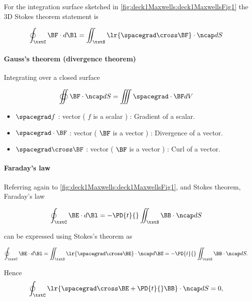 For the integration surface sketched in \cref{fig:deck1Maxwells:deck1MaxwellsFig1} the 3D Stokes theorem statement is

\begin{dmath}\label{eqn:uwavesLecture1:140}
\oint_\txtC \BF \cdot d\Bl = \iint_\txtS \lr{ \spacegrad \cross \BF } \cdot \ncap dS
\end{dmath}

\paragraph{Gauss's theorem (divergence theorem)}

Integrating over a closed surface

\begin{dmath}\label{eqn:uwavesLecture1:160}
\oiint \BF \cdot \ncap dS = \iiint \spacegrad \cdot \BF dV
\end{dmath}

\begin{itemize}
\item \( \spacegrad f \) :  vector ( \( f \) is a scalar ) : Gradient of a scalar.
\item \( \spacegrad \cdot \BF \) :  vector ( \( \BF \) is a vector ) : Divergence of a vector.
\item \( \spacegrad \cross \BF \) :  vector ( \( \BF \) is a vector ) : Curl of a vector.
\end{itemize}

\paragraph{Faraday's law}

Referring again to \cref{fig:deck1Maxwells:deck1MaxwellsFig1}, and Stokes theorem, Faraday's law

\begin{dmath}\label{eqn:uwavesLecture1:180}
\oint_\txtC \BE \cdot d\Bl = - \PD{t}{} \iint_\txtS \BB \cdot \ncap dS
\end{dmath}

can be expressed using Stokes's theorem as

\begin{dmath}\label{eqn:uwavesLecture1:200}
\oint_\txtC \BE \cdot d\Bl = \iint_\txtS \lr{ \spacegrad \cross \BE} \cdot \ncap d\BS
=
- \PD{t}{} \iint_\txtS \BB \cdot \ncap dS.
\end{dmath}

Hence
\begin{dmath}\label{eqn:uwavesLecture1:220}
\oint_\txtC 
\lr{
\spacegrad \cross \BE
+ \PD{t}{} \BB 
}
\cdot \ncap dS
= 0,
\end{dmath}

